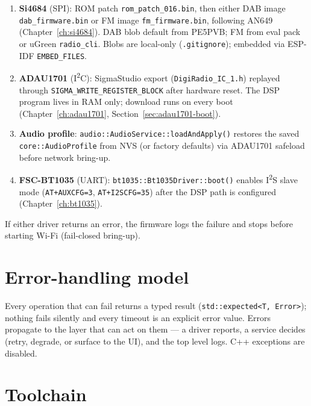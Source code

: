 \begin{enumerate}
  \item \textbf{Si4684} (SPI): ROM patch \texttt{rom\_patch\_016.bin}, then either
    DAB image \texttt{dab\_firmware.bin} or FM image \texttt{fm\_firmware.bin},
    following AN649 (Chapter~\ref{ch:si4684}). DAB blob default from PE5PVB; FM
    from eval pack or uGreen \texttt{radio\_cli}. Blobs are local-only
    (\texttt{.gitignore}); embedded via ESP-IDF \texttt{EMBED\_FILES}.
  \item \textbf{ADAU1701} (I\textsuperscript{2}C): SigmaStudio export
    (\texttt{DigiRadio\_IC\_1.h}) replayed through
    \texttt{SIGMA\_WRITE\_REGISTER\_BLOCK} after hardware reset. The DSP
    program lives in RAM only; download runs on every boot
    (Chapter~\ref{ch:adau1701}, Section~\ref{sec:adau1701-boot}).
  \item \textbf{Audio profile}: \texttt{audio::AudioService::loadAndApply()}
    restores the saved \texttt{core::AudioProfile} from NVS (or factory
    defaults) via ADAU1701 safeload before network bring-up.
  \item \textbf{FSC-BT1035} (UART): \texttt{bt1035::Bt1035Driver::boot()}
    enables I\textsuperscript{2}S slave mode (\texttt{AT+AUXCFG=3},
    \texttt{AT+I2SCFG=35}) after the DSP path is configured
    (Chapter~\ref{ch:bt1035}).
\end{enumerate}

If either driver returns an error, the firmware logs the failure and stops
before starting Wi-Fi (fail-closed bring-up).

\section{Error-handling model}
\label{sec:fw-errors}

Every operation that can fail returns a typed result
(\texttt{std::expected<T, Error>}); nothing fails silently and every
timeout is an explicit error value. Errors propagate to the layer that
can act on them --- a driver reports, a service decides (retry, degrade,
or surface to the UI), and the top level logs. C++ exceptions are
disabled.

\section{Toolchain}
\label{sec:fw-toolchain}


